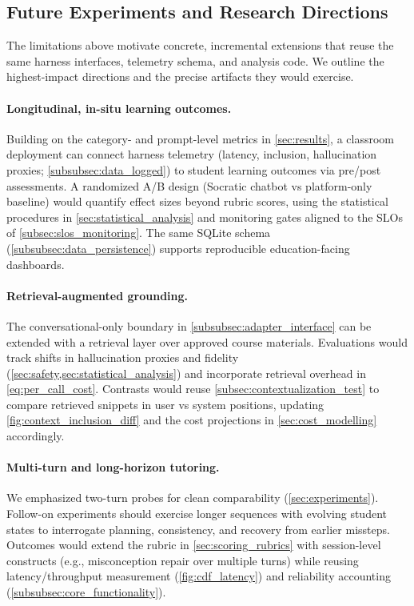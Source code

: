\subsection{Future Experiments and Research Directions}
\label{subsec:future_directions}

The limitations above motivate concrete, incremental extensions that reuse the same harness interfaces, telemetry schema, and analysis code. We outline the highest-impact directions and the precise artifacts they would exercise.

\paragraph{Longitudinal, in-situ learning outcomes.} Building on the category- and prompt-level metrics in \cref{sec:results}, a classroom deployment can connect harness telemetry (latency, inclusion, hallucination proxies; \cref{subsubsec:data_logged}) to student learning outcomes via pre/post assessments. A randomized A/B design (Socratic chatbot vs platform-only baseline) would quantify effect sizes beyond rubric scores, using the statistical procedures in \cref{sec:statistical_analysis} and monitoring gates aligned to the SLOs of \cref{subsec:slos_monitoring}. The same SQLite schema (\cref{subsubsec:data_persistence}) supports reproducible education-facing dashboards.

\paragraph{Retrieval-augmented grounding.} The conversational-only boundary in \cref{subsubsec:adapter_interface} can be extended with a retrieval layer over approved course materials. Evaluations would track shifts in hallucination proxies and fidelity (\cref{sec:safety,sec:statistical_analysis}) and incorporate retrieval overhead in \cref{eq:per_call_cost}. Contrasts would reuse \cref{subsec:contextualization_test} to compare retrieved snippets in user vs system positions, updating \cref{fig:context_inclusion_diff} and the cost projections in \cref{sec:cost_modelling} accordingly.

\paragraph{Multi-turn and long-horizon tutoring.} We emphasized two-turn probes for clean comparability (\cref{sec:experiments}). Follow-on experiments should exercise longer sequences with evolving student states to interrogate planning, consistency, and recovery from earlier missteps. Outcomes would extend the rubric in \cref{sec:scoring_rubrics} with session-level constructs (e.g., misconception repair over multiple turns) while reusing latency/throughput measurement (\cref{fig:cdf_latency}) and reliability accounting (\cref{subsubsec:core_functionality}).


